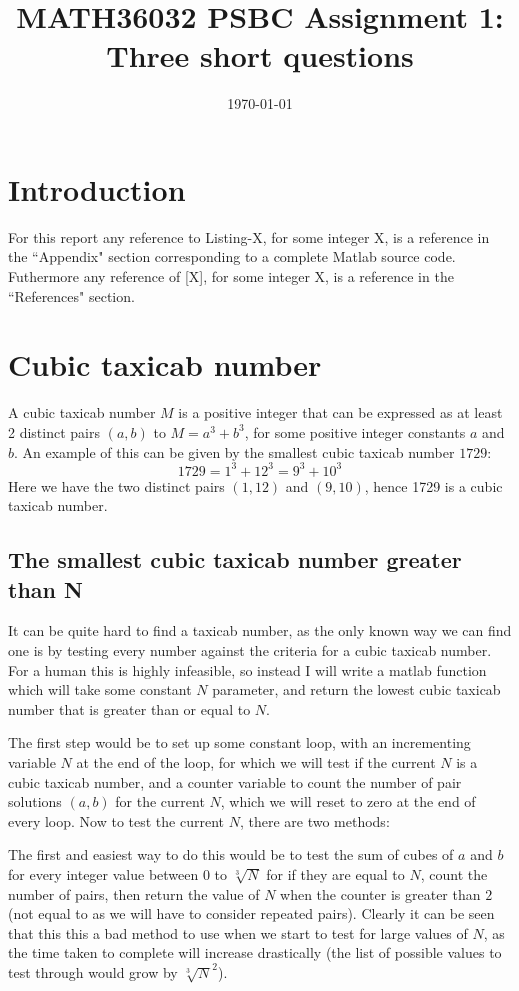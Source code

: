 \documentclass[12pt]{article}
\title{\vspace{-60pt}MATH36032 PSBC Assignment 1: Three short questions}
\date{\today}
\begin{document}
\maketitle

\section*{Introduction}
For this report any reference to Listing-X, for some integer X, is a reference in the ``Appendix" section corresponding to a complete Matlab source code. Futhermore any reference of [X], for some integer X, is a reference in the ``References" section.

\section{Cubic taxicab number}
A cubic taxicab number $M$ is a positive integer that can be expressed as at least 2 distinct pairs $(a,b)$ to $M=a^3+b^3$, for some positive integer constants $a$ and $b$. An example of this can be given by the smallest cubic taxicab number $1729$:
\begin{equation*}
1729 = 1^3+12^3 = 9^3+10^3
\end{equation*}
Here we have the two distinct pairs $(1, 12)$ and $(9, 10)$, hence 1729 is a cubic taxicab number.
\subsection{The smallest cubic taxicab number greater than N}
It can be quite hard to find a taxicab number, as the only known way we can find one is by testing every number against the criteria for a cubic taxicab number. For a human this is highly infeasible, so instead I will write a matlab function which will take some constant $N$ parameter, and return the lowest cubic taxicab number that is greater than or equal to $N$.

The first step would be to set up some constant loop, with an incrementing variable $N$ at the end of the loop, for which we will test if the current $N$ is a cubic taxicab number, and a counter variable to count the number of pair solutions $(a,b)$ for the current $N$, which we will reset to zero at the end of every loop. Now to test the current $N$, there are two methods:

The first and easiest way to do this would be to test the sum of cubes of $a$ and $b$ for every integer value between $0$ to $\sqrt[3]{N}$ for if they are equal to $N$, count the number of pairs, then return the value of $N$ when the counter is greater than $2$ (not equal to as we will have to consider repeated pairs). Clearly it can be seen that this this a bad method to use when we start to test for large values of $N$, as the time taken to complete will increase drastically (the list of possible values to test through would grow by $\sqrt[3]{N}^2$).
\end{document}
